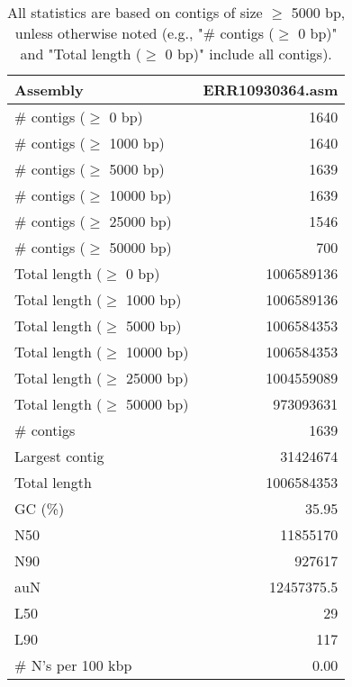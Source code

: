 \documentclass[12pt,a4paper]{article}
\begin{document}
\begin{table}[ht]
\begin{center}
\caption{All statistics are based on contigs of size $\geq$ 5000 bp, unless otherwise noted (e.g., "\# contigs ($\geq$ 0 bp)" and "Total length ($\geq$ 0 bp)" include all contigs).}
\begin{tabular}{|l*{1}{|r}|}
\hline
Assembly & ERR10930364.asm \\ \hline
\# contigs ($\geq$ 0 bp) & 1640 \\ \hline
\# contigs ($\geq$ 1000 bp) & 1640 \\ \hline
\# contigs ($\geq$ 5000 bp) & 1639 \\ \hline
\# contigs ($\geq$ 10000 bp) & 1639 \\ \hline
\# contigs ($\geq$ 25000 bp) & 1546 \\ \hline
\# contigs ($\geq$ 50000 bp) & 700 \\ \hline
Total length ($\geq$ 0 bp) & 1006589136 \\ \hline
Total length ($\geq$ 1000 bp) & 1006589136 \\ \hline
Total length ($\geq$ 5000 bp) & 1006584353 \\ \hline
Total length ($\geq$ 10000 bp) & 1006584353 \\ \hline
Total length ($\geq$ 25000 bp) & 1004559089 \\ \hline
Total length ($\geq$ 50000 bp) & 973093631 \\ \hline
\# contigs & 1639 \\ \hline
Largest contig & 31424674 \\ \hline
Total length & 1006584353 \\ \hline
GC (\%) & 35.95 \\ \hline
N50 & 11855170 \\ \hline
N90 & 927617 \\ \hline
auN & 12457375.5 \\ \hline
L50 & 29 \\ \hline
L90 & 117 \\ \hline
\# N's per 100 kbp & 0.00 \\ \hline
\end{tabular}
\end{center}
\end{table}
\end{document}
